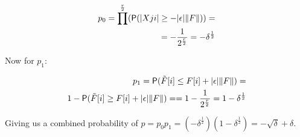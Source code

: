 \begin{align*}
p_0 = \prod^{\frac{r}{2}}(\mathsf{P}(|Xji| \geq - \lvert\epsilon\rvert \lVert F\rVert)) = \\
    = - \frac{1}{2^{\frac{r}{2}}} = - \delta^{\frac{1}{2}}
\end{align*}

Now for $p_1$:

\begin{align*}
    p_1 = \mathsf{P}(\tilde{F}[i] \leq F[i] + \lvert\epsilon\rvert \lVert F\rVert) = \\
    1 - \mathsf{P}(\tilde{F}[i] \geq F[i] + \lvert\epsilon\rvert \lVert F\rVert) =
    = 1 - \frac{1}{2^{\frac{r}{2}}} = 1 - \delta^{\frac{1}{2}}
\end{align*}

Giving us a combined probability of $p = p_0 p_1 =
(- \delta^{\frac{1}{2}}) (1 - \delta^{\frac{1}{2}}) = -\sqrt{\delta} + \delta$.
